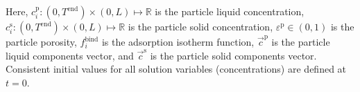 \documentclass{article}
\begin{document}
Here, $c^{\mathrm{p}}_{i}\colon  (0, T^\mathrm{end}) \times (0, L) \mapsto \mathbb{R}$ is the particle liquid concentration, $c^{\mathrm{s}}_{i}\colon  (0, T^\mathrm{end}) \times (0, L) \mapsto \mathbb{R}$ is the particle solid concentration, $\varepsilon^{\mathrm{p}}\in (0, 1)$ is the particle porosity, $f^\mathrm{bind}_{i}$ is the adsorption isotherm function, $\vec{c}^\mathrm{p}$ is the particle liquid components vector, and $\vec{c}^\mathrm{s}$ is the particle solid components vector.
Consistent initial values for all solution variables (concentrations) are defined at $t = 0$.
\end{document}
